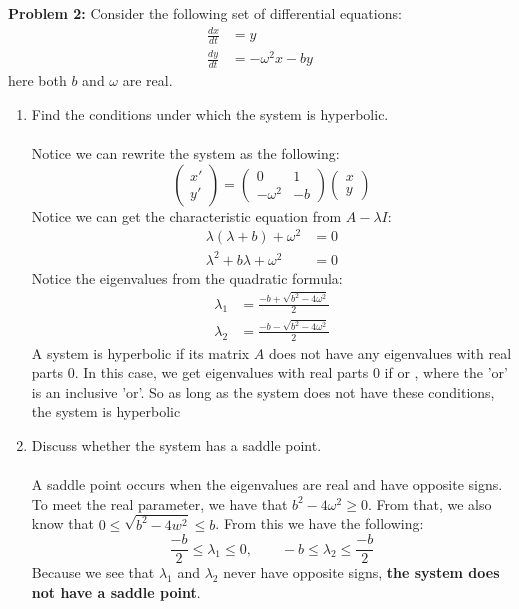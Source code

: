 \documentclass[11pt]{article}
\newcommand{\cvec}[2]{\begin{pmatrix} #1 \\ #2 \end{pmatrix}}
\newcommand{\smat}[4]{\begin{pmatrix} #1 & #2 \\ #3 & #4 \end{pmatrix}}
\newcommand{\bmath}[1]{\text{\boldmath#1\unboldmath}}
\newenvironment{problem}[1]{\textbf{Problem #1: }}{\newpage}
\begin{document}
	\begin{problem}{2}
		Consider the following set of differential equations:
		\begin{align*}
			\frac{dx}{dt} &= y \\
			\frac{dy}{dt} &= -\omega^2x - by
		\end{align*}
		here both $b$ and $\omega$ are real.
		\begin{enumerate}[label = (\alph*)]
			\item Find the conditions under which the system is hyperbolic.
			\\ \\
			Notice we can rewrite the system as the following:
			\[\cvec{x'}{y'} = \smat{0}{1}{-\omega^2}{-b}\cvec{x}{y}\]
			Notice we can get the characteristic equation from $A - \lambda I$:
			\begin{align*}
				\lambda(\lambda + b) + \omega^2 &= 0 \\
				\lambda^2 + b\lambda + \omega^2 &= 0
			\end{align*}
			Notice the eigenvalues from the quadratic formula:
			\begin{align*}
				\lambda_1 &= \frac{-b + \sqrt{b^2 - 4\omega^2}}{2} \\
				\lambda_2 &= \frac{-b - \sqrt{b^2 - 4\omega^2}}{2}
			\end{align*}
			A system is hyperbolic if its matrix $A$ does not have any eigenvalues with real parts 0.  In this case, we get eigenvalues with real parts 0 if \bmath{$b = 0$} or \bmath{$\omega = 0$}, where the 'or' is an inclusive 'or'. So as long as the system does not have these conditions, the system is hyperbolic
			\item Discuss whether the system has a saddle point.
			\\ \\
			A saddle point occurs when the eigenvalues are real and have opposite signs.  To meet the real parameter, we have that $b^2 - 4\omega^2 \geq 0$.  From that, we also know that $0 \leq \sqrt{b^2 - 4w^2} \leq b$.  From this we have the following:
			\[ \frac{-b}{2} \leq \lambda_1 \leq 0,\qquad -b \leq \lambda_2 \leq \frac{-b}{2} \]
			Because we see that $\lambda_1$ and $\lambda_2$ never have opposite signs, \textbf{the system does not have a saddle point}.
		\end{enumerate}
	\end{problem}
\end{document}
